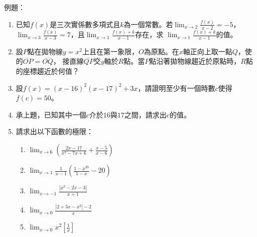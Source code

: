 \documentclass[12pt]{article}
\begin{document}
例題：
\begin{enumerate}
    \item 已知$f(x)$是三次實係數多項式且$k$為一個常數。若$\displaystyle\lim_{x\to 2}\frac{f(x)}{x-2}=-5$，
    $\displaystyle\lim_{x\to 3}\frac{f(x)}{x-3}=7$，且$\displaystyle\lim_{x\to 1}\frac{f(x)+k}{x-1}$存在，求
    $\displaystyle\lim_{x\to 1}\frac{f(x)+k}{x-1}$的值。\vspace{3cm}
    \item 設$P$點在拋物線$y=x^2$上且在第一象限，$O$為原點。在$x$軸正向上取一點$Q$，使的$\overline{OP}=\overline{OQ}$，
    接直線$\overline{QP}$交$y$軸於$R$點。當$P$點沿著拋物線趨近於原點時，$R$點的座標趨近於何值？\vspace{3cm}\newpage
    \item 設$f(x)=(x-16)^2(x-17)^2+3x$，請證明至少有一個時數$c$使得$f(c)=50$。\vspace{3cm}
    \item 承上題，已知其中一個$c$介於$16$與$17$之間，請求出$c$的值。\vspace{3cm}
    \item 請求出以下函數的極限：
    \begin{enumerate}
        \item $\displaystyle\lim_{x \to 6} (\frac{2x-17}{x^2-7x+6}+\frac{x-5}{x-6})$\vspace{2cm}
        \item $\displaystyle\lim_{x \to 1} \frac{1}{x-1}(\frac{1-x^{20}}{1-x}-20)$\vspace{2cm}
        \item $\displaystyle\lim_{x \to -1} \frac{|x^2-2x-3|}{x+1}$\vspace{2cm}
        \item $\displaystyle\lim_{x \to 0} \frac{|2+3x-x^2|-2}{x}$\vspace{2cm}
        \item $\displaystyle\lim_{x \to 0} x^2[\frac{1}{x}]$\vspace{2cm}
    \end{enumerate}
\end{enumerate}
\end{document}

